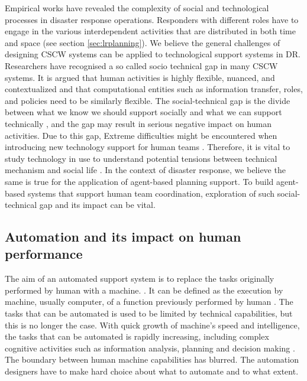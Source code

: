 Empirical works \cite{Petrescu-prahova2005,Kopena2008,Fischer2015,Zerger2003} have revealed the complexity of social and technological processes in disaster response operations. Responders with different roles have to engage in the various interdependent activities that are distributed in both time and space (see section \ref{sec:lrplanning}). We believe the general challenges of designing CSCW systems can be applied to technological support systems in DR. Researchers have recognised a so called socio technical gap in many CSCW systems. It is argued that \cite{Ackerman2000}  human activities is highly flexible, nuanced, and contextualized and that computational entities such as information transfer, roles, and policies need to be similarly flexible. The social-technical gap is the divide between what we know we should support socially and what we can support technically \cite{Ackerman2000}, and the gap may result in serious negative impact on human activities. Due to this gap, Extreme difficulties might be encountered when introducing new technology support for human teams \cite{Bowers1994,Abbott1994a}. Therefore, it is vital to study technology in use to understand potential tensions between technical mechanism and social life \cite{Bowers1994}.  In the context of disaster response, we believe the same is true for the application of agent-based planning support. To build agent-based systems that support human team coordination, exploration of such social-technical gap and its impact can be vital. \\ 



\subsection{Automation and its impact on human performance}
The aim of an automated support system is to replace the tasks originally performed by human with a machine. \cite{Bradshaw2011} . It can be defined as the execution by machine, usually computer, of a function previously performed by human \cite{Parasuraman1997}. The tasks that can be automated is used to be limited by technical capabilities, but this is no longer the case. With quick growth of machine's speed and intelligence, the tasks that can be automated is rapidly increasing, including complex cognitive activities such as information analysis, planning and decision making \cite{Parasuraman2000}. The boundary between human machine capabilities has blurred. The automation designers have to make hard choice about what to automate and to what extent.\\

